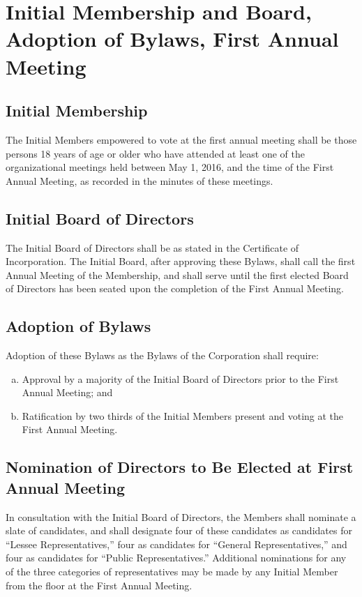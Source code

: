 \section{Initial Membership and Board, Adoption of Bylaws, First Annual Meeting}

\subsection{Initial Membership}
The Initial Members empowered to vote at the first annual meeting
shall be those persons 18 years of age or older who have attended at
least one of the organizational meetings held between May 1, 2016, and
the time of the First Annual Meeting, as recorded in the minutes of
these meetings.

\subsection{Initial Board of Directors}
The Initial Board of Directors shall be as stated in the Certificate
of Incorporation. The Initial Board, after approving these Bylaws,
shall call the first Annual Meeting of the Membership, and shall serve
until the first elected Board of Directors has been seated upon the
completion of the First Annual Meeting.

\subsection{Adoption of Bylaws}
Adoption of these Bylaws as the Bylaws of the Corporation shall
require:
\begin{enumerate}[a.]
  \item Approval by a majority of the Initial Board of Directors prior
    to the First Annual Meeting; and
  \item Ratification by two thirds of the Initial Members present and
    voting at the First Annual Meeting.
\end{enumerate}

\subsection{Nomination of Directors to Be Elected at First Annual Meeting}
In consultation with the Initial Board of Directors, the Members shall
nominate a slate of candidates, and shall designate four of these
candidates as candidates for “Lessee Representatives,” four as
candidates for “General Representatives,” and four as candidates for
“Public Representatives.” Additional nominations for any of the three
categories of representatives may be made by any Initial Member from
the floor at the First Annual Meeting.

